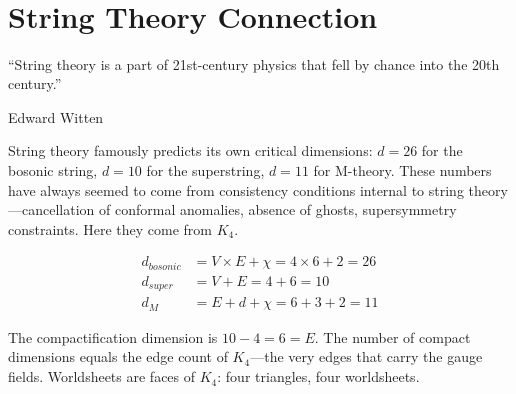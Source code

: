 \documentclass[11pt,a4paper]{book}
\def\text#1{#1}%
\begin{document}
\begin{code}
\AgdaSymbol{:}\AgdaSpace{}%
\AgdaSpace{}%
\AgdaSpace{}%
\<%
\\
\>[0]\AgdaSpace{}%
\AgdaSymbol{=}\AgdaSpace{}%
\AgdaSpace{}%
\<%
\\
%
\\[\AgdaEmptyExtraSkip]%
\>[0]\<%
\\
\>[0]\<%
\\
\>[0]\<%
\\
\>[0]\<%
\end{code}

\chapter{String Theory Connection}
\label{ch:string-theory}

\epigraph{``String theory is a part of 21st-century physics that fell by chance into the 20th century.''}{Edward Witten}

String theory famously predicts its own critical dimensions: $d = 26$ for the bosonic string, $d = 10$ for the superstring, $d = 11$ for M-theory. These numbers have always seemed to come from consistency conditions internal to string theory---cancellation of conformal anomalies, absence of ghosts, supersymmetry constraints. Here they come from $K_4$.

\begin{align}
d_{\text{bosonic}} &= V \times E + \chi = 4 \times 6 + 2 = 26 \\
d_{\text{super}} &= V + E = 4 + 6 = 10 \\
d_{\text{M}} &= E + d + \chi = 6 + 3 + 2 = 11
\end{align}

The compactification dimension is $10 - 4 = 6 = E$. The number of compact dimensions equals the edge count of $K_4$---the very edges that carry the gauge fields. Worldsheets are faces of $K_4$: four triangles, four worldsheets.
\end{document}

